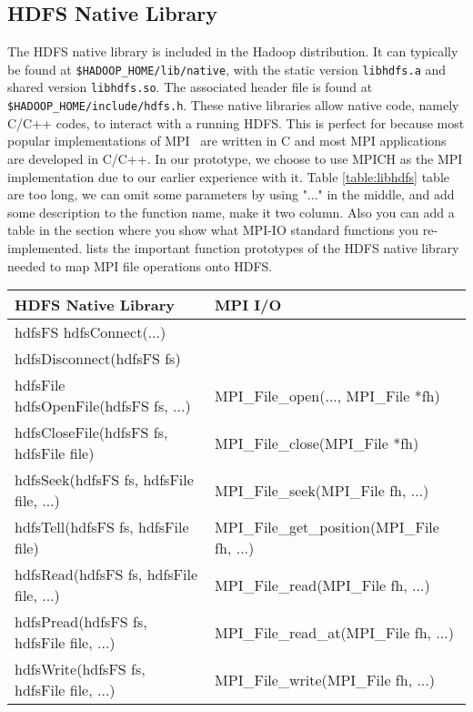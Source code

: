 \subsection{HDFS Native Library}
The HDFS native library is included in the Hadoop distribution. It can typically
be found at \texttt{\$HADOOP\_HOME/lib/native}, with the static version
\texttt{libhdfs.a} and shared version \texttt{libhdfs.so}. The associated header
file is found at \texttt{\$HADOOP\_HOME/include/hdfs.h}. These native libraries
allow native code, namely C/C++ codes, to interact with a running HDFS. This is perfect for
{\proj} because most popular implementations of MPI~\cite{mpich, openmpi} are written in C and most
MPI applications are developed in C/C++. In our prototype, we choose to use
MPICH as the MPI implementation due to our earlier experience with it.
Table \ref{table:libhdfs} {\color{red} table are too long, we can omit some
parameters by using "..." in the middle, and add some description to the
function name, make it two column. Also you can add a table in the section where
you show what MPI-IO standard functions you re-implemented. }
lists the important function prototypes of the HDFS native library needed to map
MPI file operations onto HDFS.

\begin{table*}[ht]
\center
\caption{Key HDFS Native Functions and their MPI Equivalents}
{\ttfamily
\begin{tabular}{l l}
\hline
HDFS Native Library & MPI I/O \\
\hline
hdfsFS hdfsConnect(...) & \\
hdfsDisconnect(hdfsFS fs) & \\
hdfsFile hdfsOpenFile(hdfsFS fs, ...) & MPI\_File\_open(..., MPI\_File *fh) \\
hdfsCloseFile(hdfsFS fs, hdfsFile file) & MPI\_File\_close(MPI\_File *fh) \\
hdfsSeek(hdfsFS fs, hdfsFile file, ...) & MPI\_File\_seek(MPI\_File fh, ...)\\
hdfsTell(hdfsFS fs, hdfsFile file) & MPI\_File\_get\_position(MPI\_File fh, ...)\\
hdfsRead(hdfsFS fs, hdfsFile file, ...) & MPI\_File\_read(MPI\_File fh, ...)\\
hdfsPread(hdfsFS fs, hdfsFile file, ...) & MPI\_File\_read\_at(MPI\_File fh, ...)\\
hdfsWrite(hdfsFS fs, hdfsFile file, ...) & MPI\_File\_write(MPI\_File fh, ...)\\
\hline
\end{tabular}
}
\label{table:libhdfs}
\end{table*}
					
